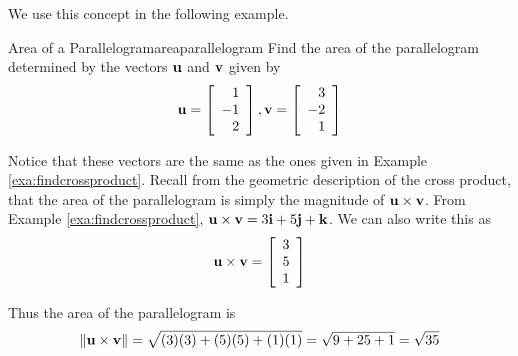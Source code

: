 \begin{center}
\end{center}

We use this concept in the following example.

\begin{example}{Area of a Parallelogram}{areaparallelogram}
Find the area of the
 parallelogram determined by the vectors ${\bf u}$
and ${\bf v}$ given by 
\begin{equation*}
{\bf u}
=
\left[
\begin{array}{r}
1 \\
-1 \\
2
\end{array}
\right], 
{\bf v}
=
\left[
\begin{array}{r}
3 \\
-2 \\
1
\end{array}
\right]
\end{equation*}
\end{example}

\begin{solution}
Notice that these vectors are the same as the ones given in Example \ref{exa:findcrossproduct}.
Recall from the geometric description of the cross
product, that the area of the parallelogram is simply the magnitude of ${\bf u} \times {\bf v}$. 
From Example \ref{exa:findcrossproduct}, ${\bf u} \times {\bf v} = 3{\bf i}+5{\bf j}+{\bf k}$.
We can also write this as
\begin{equation*}
{\bf u} \times {\bf v}
=
\left[
\begin{array}{r}
3 \\
5 \\
1
\end{array}
\right]
\end{equation*}

Thus the area of the parallelogram is 
\begin{equation*}
\| {\bf u} \times {\bf v} \| = 
\sqrt{(3)(3) + (5)(5) + (1)(1)} = 
\sqrt{9+25+1}=\sqrt{35}
\end{equation*}
\end{solution}

